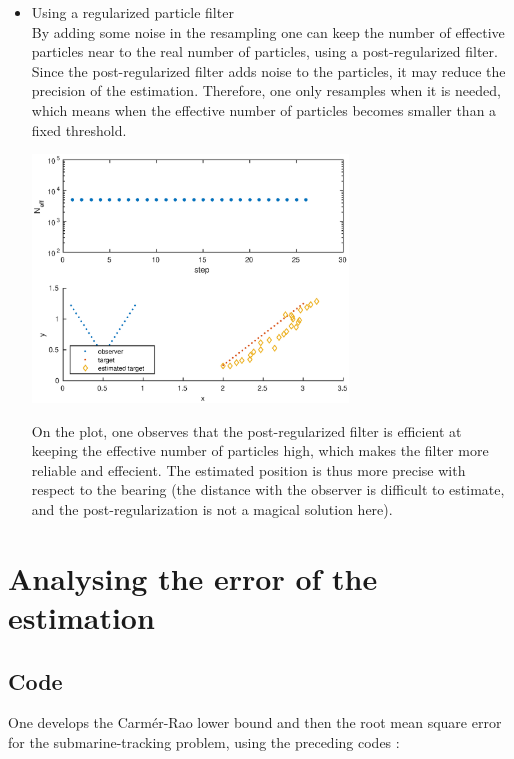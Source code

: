 \documentclass[english,DIV=13]{scrreprt}
\begin{document}
\begin{itemize}
\item Using a regularized particle filter\\
By adding some noise in the resampling one can keep the number of effective particles near to the real number of particles,
using a post-regularized filter. Since the post-regularized filter adds noise to the particles, it may reduce the precision
of the estimation. Therefore, one only resamples when it is needed, which means when the effective number of particles becomes
smaller than a fixed threshold.
\begin{center}
\includegraphics[width=0.66\textwidth]{img/q52.eps}
\end{center}

On the plot, one observes that the post-regularized filter is efficient at keeping the effective number of particles high,
which makes the filter more reliable and effecient.
The estimated position is thus more precise with respect to the bearing (the distance with the observer is difficult to
estimate, and the post-regularization is not a magical solution here).
\end{itemize}
\chapter{Analysing the error of the estimation}
\section*{Code}
One develops the Carmér-Rao lower bound and then the root mean square error for the submarine-tracking problem, using the
preceding codes :

\end{document}
